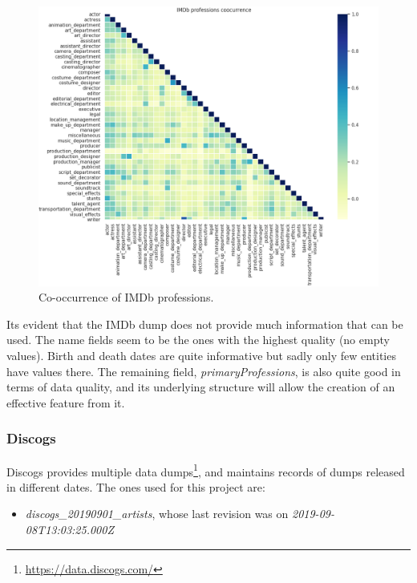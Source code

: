 \documentclass[epsfig,a4paper,11pt,titlepage,twoside,openany]{book}
\newcommand{\footurl}[1]{\footnote{\url{#1}}}
\begin{document}
\begin{figure}[]
  \centering \includegraphics[width=\textwidth]{imdb_profession_coorcurrence}
  \caption{Co-occurrence of IMDb professions.}
  \label{fig:imdb-profession-coocurrence-heatmap}
\end{figure}

Its evident that the IMDb dump does not provide much information that can be used. The name fields seem to be the ones with the highest quality (no empty values). Birth and death dates are quite informative but sadly only few entities have values there. The remaining field, \textit{primaryProfessions}, is also quite good in terms of data quality, and its underlying structure will allow the creation of an effective feature from it.



\subsubsection{Discogs}
\label{sec:shape-discogs}

Discogs provides multiple data dumps\footurl{https://data.discogs.com/}, and maintains records of dumps released in different dates. The ones used for this project are:

\begin{itemize}
    \item \textit{discogs\_20190901\_artists}, whose last revision was on \textit{2019-09-08T13:03:25.000Z}
\end{itemize}
\end{document}
